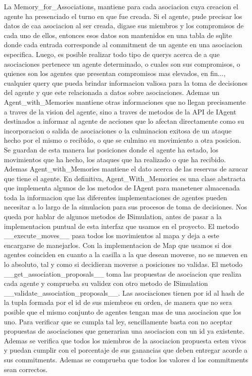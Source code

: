\documentclass[11pt]{article}
\begin{document}
La Memory_for_Associations, mantiene para cada asociacion cuya creacion el agente ha presenciado el turno en que fue creada. Si el agente, pude precisar los datos de caa asociacion al ser creada, digase sus miembros y los compromisos de cada uno de ellos, entonces esos datos son mantenidos en una tabla de sqlite donde cada entrada corresponde al commitment de un agente en una asociacion especifica. Luego, es posible realizar todo tipo de querys acerca de a que asociaciones pertenece un agente determinado, o cuales son sus compromisos, o quienes son los agentes que presentan compromisos mas elevados, en fin..., cualquier query que pueda brindar informacion valiosa para la toma de decisiones del agente y que este relacionada a datos sobre asociaciones.
Ademas un Agent_with_Memories mantiene otras informaciones que no llegan precisamente a traves de la vision del agente, sino a traves de metodos de la API de IAgent destinados a informar al agente de acciones que lo afectan directamente como su incorporacion o salida de asociaciones o la culminacion exitosa de un ataque hecho por el mismo o recibido, o que se culmino su movimiento a otra posicion. Se guardan de esta manera las posiciones donde el agente ha estado, los movimientos que ha hecho, los ataques que ha realizado o que ha recibido. Ademas Agent_with_Memories mantiene el dato acerca de las reservas de azucar que tiene el agente. 
En definitiva, Agent_With_Memories es una clase abstracta que implementa algunos de los metodos de IAgent para manetener almacenada toda la informacion que las diferentes implementaciones de agentes pueden necesitar a lo largo de la simulacion para sus procesos de toma de decisiones.
Nos queda por hablar de algunos metodos de ISimulation, antes de pasar a la implementacion puntual de esta interfaz que usamos en el proyecto.
El metodo __execute_moves__ pasa todos los movimientos al mapa y deja a este encargarse de manejarlos. Con la implementacion de Map que usamos si dos agentes coinciden en cuanto a la casilla a la que desean moverse, no se mueven en lo absoluto, tal y como si decidieran moverse a posiciones no validas.
El metodo __get_association_proposals__ toma las propuestas de asociacion que realiza cada agente y comprueba su validez con otro metodo de ISimulation __validate_association_proposals__.
Las asociaciones tienen por id al hash de la tupla formada por el id de sus miembros en orden, de manera que no sera posible que el mismo conjunto de agentes tengan mas de una asociacion que los uno. Para verificar que se cumpla tal ley, sencillamente basta con no aceptar propuestas de asociaciones que generarian una asociacion con un id ya existente. Ademas se verifica que todos los miembros de la asociacion propuesta esten vivos y puedan cumplir con el porcentaje de sus ganancias que deben entregar acorde a sus commitments. Ademas se comprueba que todos los valores d los commitments sean correctos.
\end{document}
